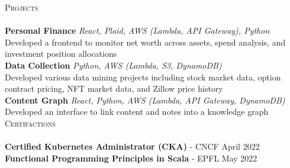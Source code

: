 \documentclass[a4paper]{article}
\newcommand{\lineunder} {
    \vspace*{-8pt} \\
    \hspace*{-18pt} \hrulefill \\
}
\newcommand{\header} [1] {
    {\hspace*{-18pt}\vspace*{6pt} \textsc{#1}}
    \vspace*{-6pt} \lineunder
}
\begin{document}
\header{Projects}
{\textbf{Personal Finance}} {\sl React, Plaid, AWS (Lambda, API Gateway), Python} \\
Developed a frontend to monitor net worth across assets, spend analysis, and investment position allocations\\
{\textbf{Data Collection}} {\sl Python, AWS (Lambda, S3, DynamoDB)}\\
Developed various data mining projects including stock market data, option contract pricing, NFT market data, and Zillow price history\\
{\textbf{Content Graph}} {\sl React, Python, AWS (Lambda, API Gateway, DynamoDB)}\\
Developed an interface to link content and notes into a knowledge graph\\

\header{Certifactions}
\textbf{Certified Kubernetes Administrator (CKA)} - CNCF \hfill April 2022\\
\vspace*{1mm}
\textbf{Functional Programming Principles in Scala} - EPFL \hfill May 2022\\
\vspace*{1mm}

\ 
\end{document}
